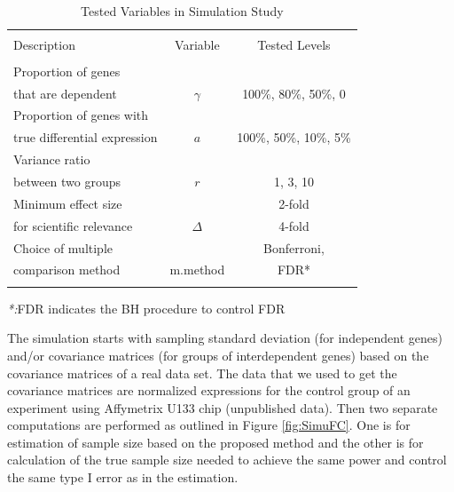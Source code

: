 \documentclass{bioinfo}
\begin{document}
\begin{table}\centering
  \caption{Tested Variables in Simulation Study}\ \\
  \begin{tabular}{lcc}
    \hline\hline
    \\
    Description & Variable & Tested Levels \\
    \\
    \hline\hline
    Proportion of genes & & \\
    that are dependent & $\gamma$ & 100\%, 80\%, 50\%, 0\\
    \hline
    Proportion of genes with & & \\
    true differential expression & $a$ & 100\%, 50\%,
    10\%, 5\% \\
    \hline
    Variance ratio &  &\\
    between two groups & $r$ & 1, 3, 10  \\
    \hline
    Minimum effect size  & &2-fold \\
    for scientific relevance & $\Delta$ & 4-fold \\
    \hline
    Choice of multiple  & & Bonferroni,  \\
    comparison method & m.method & FDR* \\
    \hline\hline\\
  \end{tabular}
  \emph{*:}FDR indicates the BH procedure to control FDR
  \label{tb:SimuVariables}
\end{table}

The simulation starts with sampling standard deviation (for
independent genes) and/or covariance matrices (for groups of
interdependent genes) based on the covariance matrices of a real
data set. The data that we used to get the covariance matrices are
normalized expressions for the control group of an experiment
using Affymetrix U133 chip (unpublished data). Then two separate
computations are performed as outlined in Figure \ref{fig:SimuFC}.
One is for estimation of sample size based on the proposed method
and the other is for calculation of the true sample size needed to
achieve the same power and control the same type I error as in the
estimation.
\end{document}
